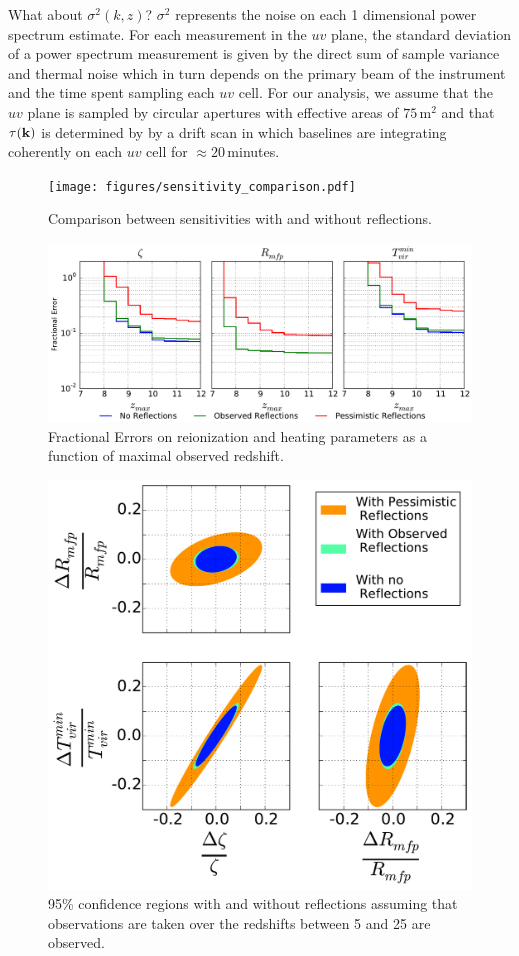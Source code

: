 \documentclass[twocolumn]{emulateapj}
\begin{document}
What about $\sigma^2(k,z)$? $\sigma^2$ represents the noise on each 1 dimensional power spectrum estimate. For each measurement in the $uv$ plane, the standard deviation of a power spectrum measurement is given by the direct sum of sample variance and thermal noise \citep{McQuinn:2006} which in turn depends on the primary beam of the instrument and the time spent sampling each $uv$ cell. For our analysis, we assume that the $uv$ plane is sampled by circular apertures with effective areas of $75$\,m$^2$ and that $\tau({\bf k})$ is determined by by a drift scan in which baselines are integrating coherently on each $uv$ cell for $\approx 20$\,minutes. 


\begin{figure}
\texttt{[image: figures/sensitivity\_comparison.pdf]}
\caption{Comparison between sensitivities with and without reflections.}
\end{figure}




\begin{figure}[h!]
\includegraphics[width=\textwidth]{figures/sigmaVsZ_reionization_v2.pdf}
\caption{Fractional Errors on reionization and heating parameters as a function of maximal observed redshift.}
\end{figure}

\begin{figure}[h!]
\includegraphics[width=.5\textwidth]{figures/reionization_triangle_compare_v2.pdf}
\caption{95\% confidence regions with and without reflections assuming that observations are taken over the redshifts between 5 and 25 are observed.}
\end{figure}
\end{document}
